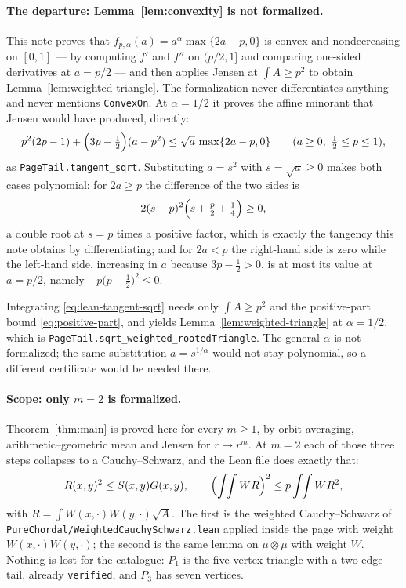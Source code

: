 \documentclass[11pt]{article}
\begin{document}
\paragraph{The departure: Lemma~\ref{lem:convexity} is not formalized.}
This note proves that $f_{p,\alpha}(a)=a^\alpha\max\{2a-p,0\}$ is convex and
nondecreasing on $[0,1]$ --- by computing $f'$ and $f''$ on $(p/2,1]$ and
comparing one-sided derivatives at $a=p/2$ --- and then applies Jensen at
$\int A\geq p^2$ to obtain Lemma~\ref{lem:weighted-triangle}.  The
formalization never differentiates anything and never mentions
\texttt{ConvexOn}.  At $\alpha=1/2$ it proves the affine minorant that Jensen
would have produced, directly:
\begin{equation}
 p^2(2p-1)+\Bigl(3p-\tfrac12\Bigr)(a-p^2)
 \leq\sqrt a\,\max\{2a-p,0\}
 \qquad (a\geq0,\ \tfrac12\leq p\leq1),
 \label{eq:lean-tangent-sqrt}
\end{equation}
as \texttt{PageTail.tangent\_sqrt}.  Substituting $a=s^2$ with $s=\sqrt a\geq0$
makes both cases polynomial: for $2a\geq p$ the difference of the two sides is
\[
 2(s-p)^2\Bigl(s+\tfrac p2+\tfrac14\Bigr)\geq0,
\]
a double root at $s=p$ times a positive factor, which is exactly the tangency
this note obtains by differentiating; and for $2a<p$ the right-hand side is
zero while the left-hand side, increasing in $a$ because $3p-\frac12>0$, is at
most its value at $a=p/2$, namely $-p\bigl(p-\frac12\bigr)^2\leq0$.

Integrating \eqref{eq:lean-tangent-sqrt} needs only $\int A\geq p^2$ and the
positive-part bound \eqref{eq:positive-part}, and yields
Lemma~\ref{lem:weighted-triangle} at $\alpha=1/2$, which is
\texttt{PageTail.sqrt\_weighted\_rootedTriangle}.  The general $\alpha$ is not
formalized; the same substitution $a=s^{1/\alpha}$ would not stay polynomial,
so a different certificate would be needed there.

\paragraph{Scope: only $m=2$ is formalized.}
Theorem~\ref{thm:main} is proved here for every $m\geq1$, by orbit averaging,
arithmetic--geometric mean and Jensen for $r\mapsto r^m$.  At $m=2$ each of
those three steps collapses to a Cauchy--Schwarz, and the Lean file does
exactly that:
\[
 R(x,y)^2\leq S(x,y)G(x,y),\qquad
 \Bigl(\int\!\!\int WR\Bigr)^{2}\leq p\int\!\!\int WR^2,
\]
with $R=\int W(x,\cdot)W(y,\cdot)\sqrt A$.  The first is the weighted
Cauchy--Schwarz of \texttt{PureChordal/WeightedCauchySchwarz.lean} applied
inside the page with weight $W(x,\cdot)W(y,\cdot)$; the second is the same
lemma on $\mu\otimes\mu$ with weight $W$.  Nothing is lost for the catalogue:
$P_1$ is the five-vertex triangle with a two-edge tail, already
\texttt{verified}, and $P_3$ has seven vertices.
\end{document}
